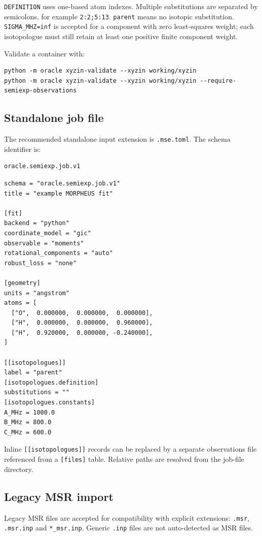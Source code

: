 \documentclass[11pt]{article}
\begin{document}
\noindent
\texttt{DEFINITION} uses one-based atom indexes.  Multiple substitutions are
separated by semicolons, for example \texttt{2:2;5:13}.  \texttt{parent} means
no isotopic substitution.  \texttt{SIGMA\_MHZ=inf} is accepted for a component
with zero least-squares weight; each isotopologue must still retain at least
one positive finite component weight.

Validate a container with:

\begin{lstlisting}[style=oracle]
python -m oracle xyzin-validate --xyzin working/xyzin
python -m oracle xyzin-validate --xyzin working/xyzin --require-semiexp-observations
\end{lstlisting}

\subsection{Standalone job file}

The recommended standalone input extension is \texttt{.mse.toml}.  The schema
identifier is:
\begin{lstlisting}[style=oracle]
oracle.semiexp.job.v1
\end{lstlisting}

\begin{lstlisting}[style=oracle]
schema = "oracle.semiexp.job.v1"
title = "example MORPHEUS fit"

[fit]
backend = "python"
coordinate_model = "gic"
observable = "moments"
rotational_components = "auto"
robust_loss = "none"

[geometry]
units = "angstrom"
atoms = [
  ["O",  0.000000,  0.000000,  0.000000],
  ["H",  0.000000,  0.000000,  0.960000],
  ["H",  0.920000,  0.000000, -0.240000],
]

[[isotopologues]]
label = "parent"
[isotopologues.definition]
substitutions = ""
[isotopologues.constants]
A_MHz = 1000.0
B_MHz = 800.0
C_MHz = 600.0
\end{lstlisting}

Inline \texttt{[[isotopologues]]} records can be replaced by a separate
observations file referenced from a \texttt{[files]} table.  Relative paths are
resolved from the job-file directory.

\subsection{Legacy MSR import}

Legacy MSR files are accepted for compatibility with explicit extensions:
\texttt{.msr}, \texttt{.msr.inp} and \texttt{*\_msr.inp}.  Generic
\texttt{.inp} files are not auto-detected as MSR files.
\end{document}
